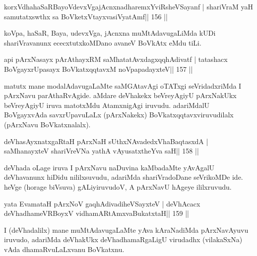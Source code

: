 \begin{shl}
korxVdhahaSaRBayoVdevxVgajAcnxnadharemxYviRsheVSayanf |
shariVraM yaH samutatxswthx sa BoVketxVtayxvasiVyatAmf\hfill || 156 ||
\end{shl}

\begin{artha}
koVpa, haSaR, Baya, udevxVga, jAcnxna muMtAdavugaLiMda kUDi 
shariVravanunx ececxtutxkoMDano avaneV BoVkAtx eMdu tiLi.
\end{artha}


\begin{shl}
api pArxNasayx pArAthayxRM saMhatatAvxdagxqqhAdivatf |
tatashacx BoVgayxrUpasayx BoVkatxqqtavxM noVpapadayxteV\hfill || 157 ||
\end{shl}

\begin{artha}
matutx mane modalAdavugaLaMte saMGAtavAgi oTATxgi seVridadxriMda I  pArxNavu parAthaRvAgide. aMdare deVhakekx beVreyAgiyU pArxNakUkx  beVreyAgiyU iruva matotxMdu AtamxnigAgi iruvudu. adariMdalU BoVgayxvAda savxrUpavuLaLx (pArxNakekx) BoVkatxqqtavxviruvudilalx (pArxNavu BoVkatxnalalx).
\end{artha}


\begin{shl}
deVhasAyxnatxgaRtaH pArxNaH sUthxNAvadedxVhaBaqtasxdA |
saMhanayxteV shariVreVNa yathA vAyusatxtheYva saH\hfill || 158 ||
\end{shl}

\begin{artha}
deVhada oLage iruva I pArxNavu naDuvina kaMbadaMte yAvAgalU deVhavanunx  hiDidu nililxsuvudu, adariMda shariVradoDane seVrikoMDe ide. heVge (horage biVsuva) gALiyiruvudoV, A pArxNavU hAgeye ililxruvudu.
\end{artha}

\begin{shl}
yata EvamataH pArxNoV gaqhAdivadiheVSayxteV |
deVhAcacx deVhadhameVRBoyxV vidhamARtAmx\s vaBukatxtaH\hfill || 159 ||
\end{shl}

\begin{artha}
I (deVhadalilx) mane muMtAdavugaLaMte yAva kAraNadiMda pArxNavAyuvu iruvudo, adariMda deVhakUkx deVhadhamaRgaLigU virudadhx (vilakaSxNa) vAda dhamaRvuLaLxvanu BoVkatxnu.
\end{artha}

